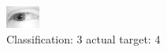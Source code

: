 \begin{figure}[h!]
\begin{center}
\includegraphics[width=0.60\columnwidth]{figures/ID2412_class_3_target_4.png}
\end{center}
\caption{ Classification: 3 actual target: 4}
\label{fig:ID2412_class_3_target_4}
\end{figure}
